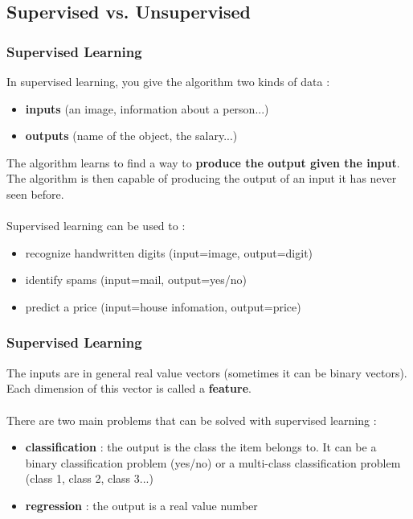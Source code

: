 \documentclass{beamer}
\begin{document}
\subsection{Supervised vs. Unsupervised}
\begin{frame}
  \frametitle{Supervised Learning}
  In supervised  learning, you give the algorithm two kinds of data :
  \begin{itemize}
    \item \textbf{inputs} (an image, information about a person...)
    \item \textbf{outputs} (name of the object, the salary...)
  \end{itemize}

  The algorithm learns to find a way to \textbf{produce the output given the
  input}. The algorithm is then capable of producing the output of an input it
  has never seen before. \\~\\
  Supervised learning can be used to :
  \begin{itemize}
    \item recognize handwritten digits (input=image, output=digit)
    \item identify spams (input=mail, output=yes/no)
    \item predict a price (input=house infomation, output=price)
  \end{itemize}
\end{frame}

\begin{frame}
  \frametitle{Supervised Learning}
  The inputs are in general real value vectors (sometimes it can be binary
  vectors). Each dimension of this vector is
  called a \textbf{feature}. \\~\\

  There are two main problems that can be solved with supervised learning :
  \begin{itemize}
    \item \textbf{classification} : the output is the class the item belongs to.
      It can be a binary classification problem (yes/no) or a multi-class
      classification problem (class 1, class 2, class 3...)
    \item \textbf{regression} : the output is a real value number
  \end{itemize}
\end{frame}
\end{document}
